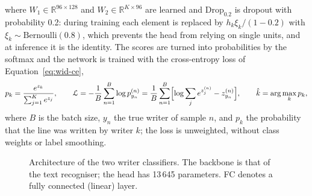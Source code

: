 where $W_1\in\mathbb R^{96\times128}$ and $W_2\in\mathbb R^{K\times96}$ are learned and $\mathrm{Drop}_{0.2}$ is dropout \cite{srivastava2014} with probability 0.2: during training each element is replaced by $h_k\xi_k/(1-0.2)$ with $\xi_k\sim\mathrm{Bernoulli}(0.8)$, which prevents the head from relying on single units, and at inference it is the identity.
The scores are turned into probabilities by the softmax and the network is trained with the cross-entropy loss of Equation~\ref{eq:wid-ce},
\begin{equation}
p_k=\frac{e^{z_k}}{\sum_{j=1}^{K}e^{z_j}},\qquad
\mathcal L=-\frac1B\sum_{n=1}^{B}\log p^{(n)}_{y_n}=\frac1B\sum_{n=1}^B\Bigl[\log\sum_je^{z^{(n)}_j}-z^{(n)}_{y_n}\Bigr],\qquad\hat k=\arg\max_kp_k,
\label{eq:wid-ce}
\end{equation}
where $B$ is the batch size, $y_n$ the true writer of sample $n$, and $p_k$ the probability that the line was written by writer $k$; the loss is unweighted, without class weights or label smoothing.

\begin{figure}[h]
\centering
{}
\caption{Architecture of the two writer classifiers. The backbone is that of the text recogniser; the head has 13\,645 parameters. FC denotes a fully connected (linear) layer.}
\label{fig:wid-arch}
\end{figure}


